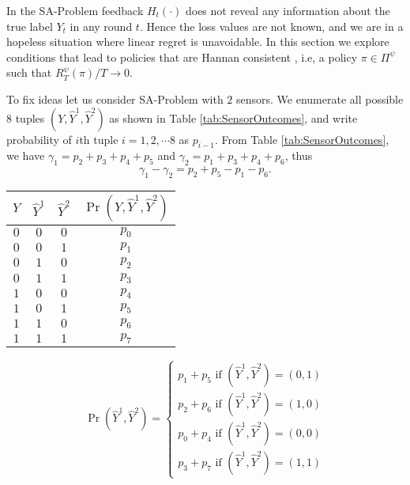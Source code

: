 In the SA-Problem feedback $H_t(\cdot)$ does not reveal any information about the true label $Y_t$ in any round $t$. Hence the loss values are not known, and we are in a hopeless situation where linear regret is unavoidable. In this section we explore conditions that lead to policies that are Hannan consistent \cite{Hannan1957_HannanConsistency_Hannan}, i.e, a policy $\pi\in \Pi^\psi$ such that $R_T^\psi (\pi)/T \rightarrow 0$.

To fix ideas let us consider SA-Problem with $2$ sensors. We enumerate all possible $8$ tuples $(Y, \hat{Y}^1, \hat{Y}^2)$ as shown in Table \ref{tab:SensorOutcomes}, and write probability of $i$th tuple $i=1,2,\cdots 8$ as $p_{i-1}$.  From Table \ref{tab:SensorOutcomes}, we have  $\gamma_1=p_2+p_3+p_4+p_5$ and $\gamma_2=p_1+p_3+p_4+p_6$, thus
\begin{equation}
	\gamma_1-\gamma_2 = p_2+p_5-p_1-p_6.
\end{equation}

\begin{minipage}{0.5\textwidth}
	\vspace{.5cm}
	\begin{tabular}[c]{ c|c|c|c } 
		\label{tab:SensorOutcomes}
		$Y$ & $\hat{Y}^1$ & $\hat{Y}^2$ & $\Pr(Y, \hat{Y}^1, \hat{Y}^2)$ \\ \hline 
		$0$ & $0$ & $0$ & $p_0$ \\  \hline
		$0$ & $0$ & $1$ & $p_1$ \\  \hline
		$0$ & $1$ & $0$ & $p_2$ \\  \hline
		$0$ & $1$ & $1$ & $p_3$ \\  \hline
		$1$ & $0$ & $0$ & $p_4$ \\  \hline
		$1$ & $0$ & $1$ & $p_5$ \\  \hline
		$1$ & $1$ & $0$ & $p_6$ \\  \hline
		$1$ & $1$ & $1$ & $p_7$ \\  \hline
		
	\end{tabular}
		\vspace{.5cm}
\end{minipage}\hspace{-1.5cm}
\begin{minipage}[c]{0.6\textwidth}
		\vspace{.5cm}
		\centering
	\hspace{-5cm}		
\begin{equation}
\label{eqn:Marginals}
\Pr(\hat{Y}^1, \hat{Y}^2)=
\begin{cases}
p_1 + p_5 \mbox{  if } (\hat{Y}^1, \hat{Y}^2)=(0,1)\\
p_2 + p_6 \mbox{  if } (\hat{Y}^1, \hat{Y}^2)=(1,0)\\
p_0 + p_4 \mbox{  if } (\hat{Y}^1, \hat{Y}^2)=(0,0)\\
p_3 + p_7 \mbox{  if } (\hat{Y}^1, \hat{Y}^2)=(1,1)
\end{cases}
\end{equation}
	\vspace{.5cm}
\end{minipage}

